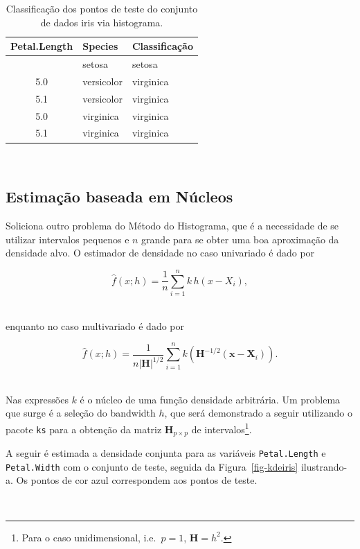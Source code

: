 \documentclass[
  a4paperpaper,
]{article}
\begin{document}
\begin{longtable}[]{@{}cll@{}}

\caption{\label{tbl-histogramasespecies2}Classificação dos pontos de
teste do conjunto de dados iris via histograma.}

\tabularnewline

\toprule\noalign{}
Petal.Length & Species & Classificação \\
\midrule\noalign{}
\endhead
\bottomrule\noalign{}
\endlastfoot
1.9 & setosa & setosa \\
5.0 & versicolor & virginica \\
5.1 & versicolor & virginica \\
5.0 & virginica & virginica \\
5.1 & virginica & virginica \\

\end{longtable}

~

\subsection{Estimação baseada em
Núcleos}\label{estimauxe7uxe3o-baseada-em-nuxfacleos}

Soliciona outro problema do Método do Histograma, que é a necessidade de
se utilizar intervalos pequenos e \(n\) grande para se obter uma boa
aproximação da densidade alvo. O estimador de densidade no caso
univariado é dado por

\[
\hat{f}(x; h) = \frac{1}{n} \sum_{i=1}^n k \,h(x - X_i),
\] ~

enquanto no caso multivariado é dado por

\[
\hat{f}(x; h) = \frac{1}{n |\mathbf{H}|^{1/2}} \sum_{i=1}^n k(\mathbf{H}^{-1/2}(\mathbf{x} - \mathbf{X}_i)).
\] ~

Nas expressões \(k\) é o núcleo de uma função densidade arbitrária. Um
problema que surge é a seleção do bandwidth \(h\), que será demonstrado
a seguir utilizando o pacote \texttt{ks} para a obtenção da matriz
\(\mathbf{H}_{p\times p}\) de intervalos\footnote{Para o caso
  unidimensional, i.e.~\(p = 1\), \(\mathbf{H} = h^2\).}.

A seguir é estimada a densidade conjunta para as variáveis
\texttt{Petal.Length} e \texttt{Petal.Width} com o conjunto de teste,
seguida da Figura~\ref{fig-kdeiris} ilustrando-a. Os pontos de cor azul
correspondem aos pontos de teste.

~
\end{document}
